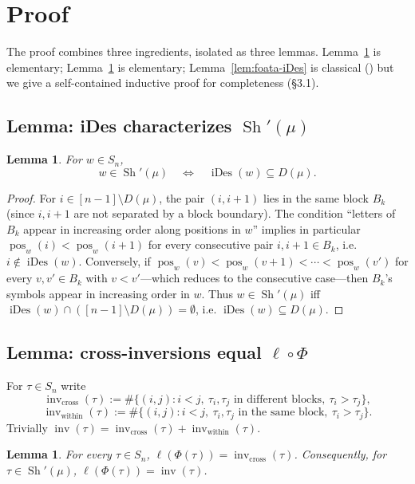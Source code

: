 \documentclass[11pt]{article}
\newtheorem{lemma}[theorem]{Lemma}
\theoremstyle{definition}
\DeclareMathOperator{\Sh}{Sh}
\DeclareMathOperator{\inv}{inv}
\DeclareMathOperator{\iDes}{iDes}
\DeclareMathOperator{\pos}{pos}
\newcommand{\Phimap}{\Phi}
\begin{document}
\section{Proof}

The proof combines three ingredients, isolated as three lemmas.  Lemma~\ref{lem:iDes-char}
is elementary; Lemma~\ref{lem:cross-inv} is elementary; Lemma~\ref{lem:foata-iDes}
is classical (\cite{FS}) but we give a self-contained inductive proof for
completeness (\S3.1).

\subsection*{Lemma: iDes characterizes $\Sh'(\mu)$}

\begin{lemma}
\label{lem:iDes-char}
For $w \in S_n$,
\[
    w \in \Sh'(\mu) \quad \Longleftrightarrow \quad \iDes(w) \subseteq D(\mu).
\]
\end{lemma}

\begin{proof}
For $i \in [n-1] \setminus D(\mu)$, the pair $(i, i+1)$ lies in the same
block $B_k$ (since $i, i+1$ are not separated by a block boundary).  The
condition ``letters of $B_k$ appear in increasing order along positions in $w$''
implies in particular $\pos_w(i) < \pos_w(i+1)$ for every consecutive pair
$i, i+1 \in B_k$, i.e. $i \notin \iDes(w)$.  Conversely, if $\pos_w(v) <
\pos_w(v+1) < \cdots < \pos_w(v')$ for every $v, v' \in B_k$ with
$v < v'$---which reduces to the consecutive case---then $B_k$'s symbols
appear in increasing order in $w$.  Thus $w \in \Sh'(\mu)$ iff
$\iDes(w) \cap ([n-1] \setminus D(\mu)) = \emptyset$, i.e. $\iDes(w) \subseteq
D(\mu)$.
\end{proof}

\subsection*{Lemma: cross-inversions equal $\ell \circ \Phimap$}

For $\tau \in S_n$ write
\[
    \inv_{\mathrm{cross}}(\tau) := \#\{(i,j) : i < j,\ \tau_i, \tau_j \text{ in different
    blocks},\ \tau_i > \tau_j\},
\]
\[
    \inv_{\mathrm{within}}(\tau) := \#\{(i,j) : i < j,\ \tau_i, \tau_j \text{ in the same
    block},\ \tau_i > \tau_j\}.
\]
Trivially $\inv(\tau) = \inv_{\mathrm{cross}}(\tau) + \inv_{\mathrm{within}}(\tau)$.

\begin{lemma}
\label{lem:cross-inv}
For every $\tau \in S_n$, $\ell(\Phimap(\tau)) = \inv_{\mathrm{cross}}(\tau)$.
Consequently, for $\tau \in \Sh'(\mu)$, $\ell(\Phimap(\tau)) = \inv(\tau)$.
\end{lemma}
\end{document}
